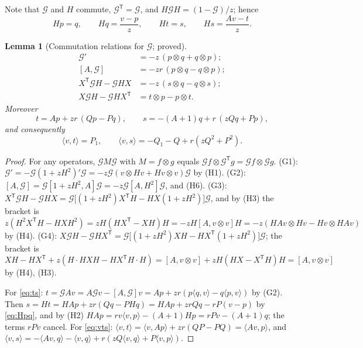 \documentclass[11pt]{article}
\newtheorem{lemma}[theorem]{Lemma}
\theoremstyle{definition}
\theoremstyle{remark}
\begin{document}
Note that $\mathcal G$ and $H$ commute, $\mathcal G^{\mathsf T}=\mathcal G$, and $H\mathcal GH=(1-\mathcal G)/z$; hence
\begin{equation}\label{eq:Hpq}
Hp=q,\qquad Hq=\frac{v-p}{z},\qquad Ht=s,\qquad Hs=\frac{Av-t}{z}.
\end{equation}

\begin{lemma}[Commutation relations for $\mathcal G$; proved]\label{lem:Gids}
\begin{align}
\mathcal G'&=-z\,(p\otimes q+q\otimes p);\tag{G1}\label{eq:G1}\\
[A,\mathcal G]&=-zr\,(p\otimes q-q\otimes p);\tag{G2}\label{eq:G2}\\
X^{\mathsf T}\mathcal GH-\mathcal GHX&=-z\,(s\otimes q-q\otimes s);\tag{G3}\label{eq:G3}\\
X\mathcal GH-\mathcal GHX^{\mathsf T}&=t\otimes p-p\otimes t.\tag{G4}\label{eq:G4}
\end{align}
Moreover
\begin{equation}\label{eq:ts}
t=Ap+zr\,(Qp-Pq),\qquad s=-(A+1)q+r\,(zQq+Pp),
\end{equation}
and consequently
\begin{equation}\label{eq:vts}
\langle v,t\rangle=P_1,\qquad \langle v,s\rangle=-Q_1-Q+r(zQ^2+P^2).
\end{equation}
\end{lemma}

\begin{proof}
For any operators, $\mathcal GM\mathcal G$ with $M=f\otimes g$ equals $\mathcal Gf\otimes\mathcal G^{\mathsf T}g=\mathcal Gf\otimes\mathcal Gg$. (G1): $\mathcal G'=-\mathcal G(1+zH^2)'\mathcal G=-z\mathcal G(v\otimes Hv+Hv\otimes v)\mathcal G$ by (H1). (G2): $[A,\mathcal G]=\mathcal G[1+zH^2,A]\mathcal G=-z\mathcal G[A,H^2]\mathcal G$, and (H6). (G3): $X^{\mathsf T}\mathcal GH-\mathcal GHX=\mathcal G\bigl[(1+zH^2)X^{\mathsf T}H-HX(1+zH^2)\bigr]\mathcal G$, and by (H3) the bracket is $z(H^2X^{\mathsf T}H-HXH^2)=zH(HX^{\mathsf T}-XH)H=-zH[A,v\otimes v]H=-z(HAv\otimes Hv-Hv\otimes HAv)$ by (H4). (G4): $X\mathcal GH-\mathcal GHX^{\mathsf T}=\mathcal G\bigl[(1+zH^2)XH-HX^{\mathsf T}(1+zH^2)\bigr]\mathcal G$; the bracket is $XH-HX^{\mathsf T}+z(H\cdot HXH-HX^{\mathsf T}H\cdot H)=[A,v\otimes v]+zH(HX-X^{\mathsf T}H)H=[A,v\otimes v]$ by (H4), (H3).

For \eqref{eq:ts}: $t=\mathcal GAv=A\mathcal Gv-[A,\mathcal G]v=Ap+zr(p\langle q,v\rangle-q\langle p,v\rangle)$ by (G2). Then $s=Ht=HAp+zr(Qq-PHq)=HAp+zrQq-rP(v-p)$ by \eqref{eq:Hpq}, and by (H2) $HAp=rv\langle v,p\rangle-(A+1)Hp=rPv-(A+1)q$; the terms $rPv$ cancel. For \eqref{eq:vts}: $\langle v,t\rangle=\langle v,Ap\rangle+zr(QP-PQ)=\langle Av,p\rangle$, and $\langle v,s\rangle=-\langle Av,q\rangle-\langle v,q\rangle+r(zQ\langle v,q\rangle+P\langle v,p\rangle)$.
\end{proof}
\end{document}
